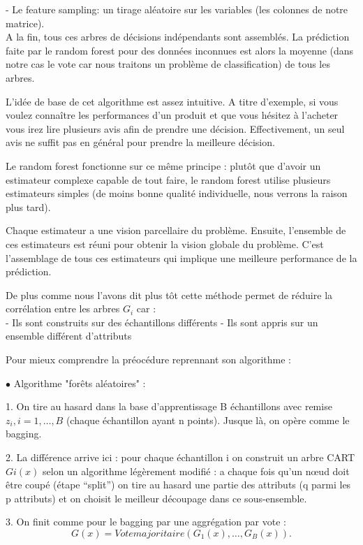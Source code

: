 \documentclass[11pt]{article}
\begin{document}
- Le feature sampling: un tirage aléatoire sur les variables (les colonnes de notre matrice).\\

A la fin, tous ces arbres de décisions indépendants sont assemblés. La prédiction faite par le random forest pour des données inconnues est alors la moyenne (dans notre cas le vote car nous traitons un problème de classification) de tous les arbres.

L'idée de base de cet algorithme est assez intuitive. A titre d’exemple, si vous voulez connaître les performances d’un produit et que vous hésitez à l’acheter vous irez lire plusieurs avis afin de prendre une décision. Effectivement, un seul avis ne suffit pas en général pour prendre la meilleure décision.

Le random forest fonctionne sur ce même principe : plutôt que d'avoir un estimateur complexe capable de tout faire, le random forest utilise plusieurs estimateurs simples (de moins bonne qualité individuelle, nous verrons la raison plus tard). 

Chaque estimateur a une vision parcellaire du problème. Ensuite, l'ensemble de ces estimateurs est réuni pour obtenir la vision globale du problème. C'est l'assemblage de tous ces estimateurs qui implique une meilleure performance de la prédiction.


De plus comme nous l'avons dit plus tôt cette méthode permet de réduire la corrélation entre les arbres $G_{i}$ car :\\

- Ils sont construits sur des échantillons différents
- Ils sont appris sur un ensemble différent d’attributs


Pour mieux comprendre la préocédure reprennant son algorithme : 


$\bullet$ Algorithme "forêts aléatoires" :

1.  On tire au hasard dans la base d’apprentissage B échantillons avec remise $z_{i},i=1,…,B$ (chaque échantillon ayant n points). Jusque là, on opère comme le bagging.

2. La différence arrive ici : pour chaque échantillon i on construit un arbre CART $Gi(x)$ selon un algorithme légèrement modifié : a chaque fois qu’un nœud doit être coupé (étape “split”) on tire au hasard une partie des attributs (q parmi les p attributs) et on choisit le meilleur découpage dans ce sous-ensemble.

3. On finit comme pour le bagging par une aggrégation par vote :
$$G(x)=Votemajoritaire(G_{1}(x),…,G_{B}(x)).$$
\end{document}
